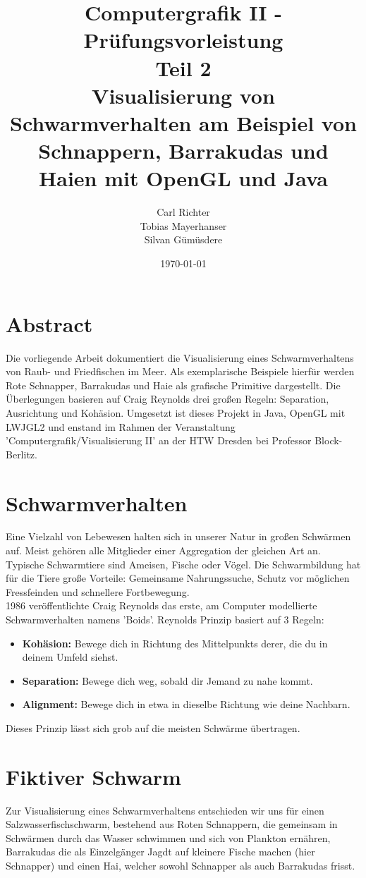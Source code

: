 \documentclass[11pt]{article}
\title{\textbf{Computergrafik II - Prüfungsvorleistung}\\Teil 2\\Visualisierung von Schwarmverhalten am Beispiel von Schnappern, Barrakudas und Haien mit OpenGL und Java}
\date{\today}
\author{Carl Richter\\
		Tobias Mayerhanser\\
		Silvan Gümüsdere}
\begin{document}
\maketitle
\newpage
\tableofcontents
\newpage
\section{Abstract}
Die vorliegende Arbeit dokumentiert die Visualisierung eines Schwarmverhaltens von Raub- und Friedfischen im Meer. Als exemplarische Beispiele hierfür werden Rote Schnapper, Barrakudas und Haie als grafische Primitive dargestellt. Die Überlegungen basieren auf Craig Reynolds drei großen Regeln: Separation, Ausrichtung und Kohäsion. Umgesetzt ist dieses Projekt in Java, OpenGL mit LWJGL2 und enstand im Rahmen der Veranstaltung 'Computergrafik/Visualisierung II' an der HTW Dresden bei Professor Block-Berlitz.
\section{Schwarmverhalten}
Eine Vielzahl von Lebewesen halten sich in unserer Natur in großen Schwärmen auf. Meist gehören alle Mitglieder einer Aggregation der gleichen Art an. Typische Schwarmtiere sind Ameisen, Fische oder Vögel. Die Schwarmbildung hat für die Tiere große Vorteile: Gemeinsame Nahrungssuche, Schutz vor möglichen Fressfeinden und schnellere Fortbewegung.\\
1986 veröffentlichte Craig Reynolds das erste, am Computer modellierte Schwarmverhalten namens 'Boids'. Reynolds Prinzip basiert auf 3 Regeln:
\begin{itemize}
	\item \textbf{Kohäsion:} Bewege dich in Richtung des Mittelpunkts derer, die du in deinem Umfeld siehst.
	\item \textbf{Separation:} Bewege dich weg, sobald dir Jemand zu nahe kommt.
	\item \textbf{Alignment:} Bewege dich in etwa in dieselbe Richtung wie deine Nachbarn.
\end{itemize}
Dieses Prinzip lässt sich grob auf die meisten Schwärme übertragen.
\section{Fiktiver Schwarm}
Zur Visualisierung eines Schwarmverhaltens entschieden wir uns für einen Salzwasserfischschwarm, bestehend aus Roten Schnappern, die gemeinsam in Schwärmen durch das Wasser schwimmen und sich von Plankton ernähren, Barrakudas die als Einzelgänger Jagdt auf kleinere Fische machen (hier Schnapper) und einen Hai, welcher sowohl Schnapper als auch Barrakudas frisst.
\end{document}
